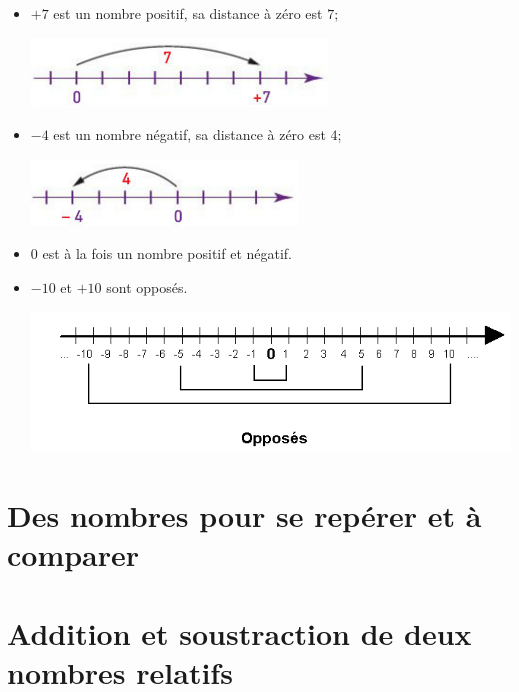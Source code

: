 \documentclass[xcolor={dvipsnames}]{beamer}
\begin{document}
\begin{frame}
	\begin{myexs}
		\begin{itemize}
			\item $+7$ est un nombre \pause positif, sa distance à zéro est \pause $7$; 
			\begin{center}
				\includegraphics[scale=0.6]{ex1}\pause
			\end{center}
			\item $\num{-4}$ est un nombre \pause négatif, sa distance à zéro est \pause $\num{4}$;
			\begin{center}
				\includegraphics[scale=0.6]{ex2}\pause
			\end{center}
			
			\item $0$ est \pause à la fois un nombre positif et négatif.%
			\item $-10$ et $+10$ sont \pause opposés.
			\begin{center}
				\includegraphics[scale=0.5]{opposes}
			\end{center}
		\end{itemize}
	\end{myexs}
\end{frame}

\section{Des nombres pour se repérer et à comparer}

%

\section{Addition et soustraction de deux nombres relatifs}
\end{document}

